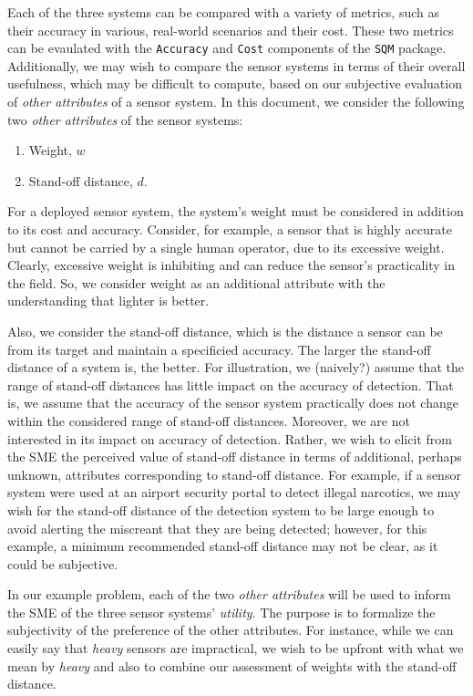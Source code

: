 \documentclass{article}
\begin{document}
Each of the three systems can be compared with a variety of metrics, such as
their accuracy in various, real-world scenarios and their cost. These two metrics
can be evaulated with the {\tt Accuracy} and {\tt Cost} components of the {\tt SQM}
package. Additionally, we may wish to compare the sensor systems in terms of their
overall usefulness, which may be difficult to compute, based on our subjective
evaluation of \emph{other attributes} of a sensor system. In this document, we
consider the following two \emph{other attributes} of the sensor systems:

\begin{enumerate}
  \item Weight, $w$
  \item Stand-off distance, $d$.
\end{enumerate}

For a deployed sensor system, the system's weight must be considered in addition to
its cost and accuracy. Consider, for example, a sensor that is highly accurate but
cannot be carried by a single human operator, due to its excessive weight. Clearly,
excessive weight is inhibiting and can reduce the sensor's practicality in the field.
So, we consider weight as an additional attribute with the understanding that lighter
is better.

Also, we consider the stand-off distance, which is the distance a sensor can be
from its target and maintain a specificied accuracy. The larger the stand-off
distance of a system is, the better. For illustration, we (naively?) assume that
the range of stand-off distances has little impact on the accuracy of detection.
That is, we assume that the accuracy of the sensor system practically does not
change within the considered range of stand-off distances. Moreover, we are not
interested in its impact on accuracy of detection. Rather, we wish to elicit from
the SME the perceived value of stand-off distance in terms of additional, perhaps
unknown, attributes corresponding to stand-off distance. For example, if a sensor
system were used at an airport security portal to detect illegal narcotics, we
may wish for the stand-off distance of the detection system to be large enough to
avoid alerting the miscreant that they are being detected; however, for this
example, a minimum recommended stand-off distance may not be clear, as it could
be subjective.

In our example problem, each of the two \emph{other attributes} will be used to
inform the SME of the three sensor systems' \emph{utility}. The purpose is to
formalize the subjectivity of the preference of the other attributes. For instance,
while we can easily say that \emph{heavy} sensors are impractical, we wish to be
upfront with what we mean by \emph{heavy} and also to combine our assessment of
weights with the stand-off distance.
\end{document}
